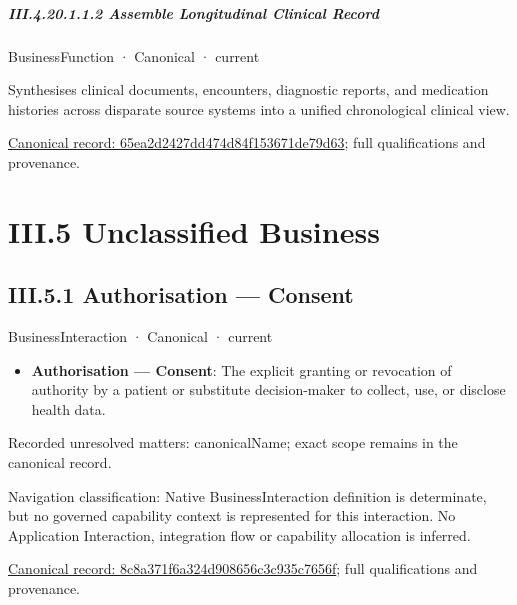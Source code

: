 \paragraph*{III.4.20.1.1.2 Assemble Longitudinal Clinical Record}
\label{navigation:III.4.20.1.1.2}

\label{element:65ea2d2427dd474d84f153671de79d63}
{\small BusinessFunction · Canonical · current}\par

Synthesises clinical documents, encounters, diagnostic reports, and medication histories across disparate source systems into a unified chronological clinical view.


{\footnotesize \href{../../../../../../../../continuum/business/business-function/65ea2d2427dd474d84f153671de79d63.md}{Canonical record: 65ea2d2427dd474d84f153671de79d63}; full qualifications and provenance.}\par
\chapter*{III.5 Unclassified Business}
\label{navigation:III.5}

\section*{III.5.1 Authorisation — Consent}
\label{navigation:III.5.1}

\label{element:8c8a371f6a324d908656c3c935c7656f}
{\small BusinessInteraction · Canonical · current}\par

\begin{itemize}


\item \textbf{Authorisation — Consent}: The explicit granting or revocation of authority by a patient or substitute decision-maker to collect, use, or disclose health data.

\end{itemize}

{\small Recorded unresolved matters: canonicalName; exact scope remains in the canonical record.}\par
{\small Navigation classification: Native BusinessInteraction definition is determinate, but no governed capability context is represented for this interaction. No Application Interaction, integration flow or capability allocation is inferred.}\par
{\footnotesize \href{../../../../../../../../continuum/business/business-interaction/8c8a371f6a324d908656c3c935c7656f.md}{Canonical record: 8c8a371f6a324d908656c3c935c7656f}; full qualifications and provenance.}\par
